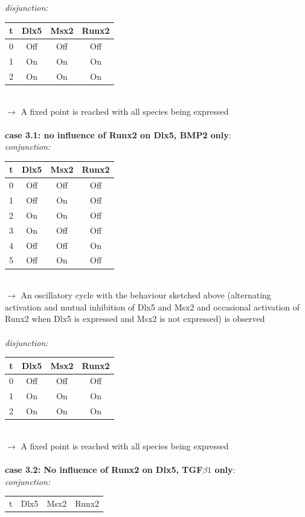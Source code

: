 \documentclass[11pt]{article}
\begin{document}
\begin{appendices}
\\ \\
\textit{disjunction:}
\\ 
\begin{tabular}{c c c c}
t & Dlx5 & Msx2 & Runx2 \\
\hline
0 & Off & Off & Off \\
1 & On & On & On \\
2 & On & On & On
\end{tabular}
\\
$\rightarrow$ A fixed point is reached with all species being expressed
\\ \\
\textbf{case 3.1: no influence of Runx2 on Dlx5, BMP2 only}: \\
\textit{conjunction:}
\\
\begin{tabular}{c c c c}
t & Dlx5 & Msx2 & Runx2 \\
\hline
0 & Off & Off & Off \\
1 & Off & On & Off \\
2 & On & On & Off \\
3 & On & Off & Off \\
4 & Off & Off & On \\
5 & Off & On & Off
\end{tabular}
\\
$\rightarrow$ An oscillatory cycle with the behaviour sketched above (alternating activation and mutual inhibition of Dlx5 and Msx2 and occasional activation of Runx2 when Dlx5 is expressed and Msx2 is not expressed) is observed  
\\ \\
\textit{disjunction:}
\\ 
\begin{tabular}{c c c c}
t & Dlx5 & Msx2 & Runx2 \\
\hline
0 & Off & Off & Off \\
1 & On & On & On \\
2 & On & On & On
\end{tabular}
\\
$\rightarrow$ A fixed point is reached with all species being expressed
\\ \\
\textbf{case 3.2: No influence of Runx2 on Dlx5, TGF$\beta1$ only}: \\
\textit{conjunction:}
\\ 
\begin{tabular}{c c c c}
t & Dlx5 & Msx2 & Runx2 \\

\end{tabular}
\end{appendices}
\end{document}
